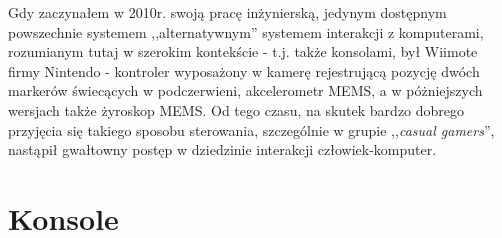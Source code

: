 \label{ch:current_state}

Gdy zaczynałem w 2010r. swoją pracę inżynierską, jedynym dostępnym powszechnie systemem ,,alternatywnym'' systemem interakcji z komputerami, rozumianym tutaj w szerokim kontekście - t.j. także konsolami, był Wiimote firmy Nintendo - kontroler wyposażony w kamerę rejestrującą pozycję dwóch markerów świecących w podczerwieni, akcelerometr MEMS, a w póżniejszych wersjach także żyroskop MEMS. Od tego czasu, na skutek bardzo dobrego przyjęcia się takiego sposobu sterowania, szczególnie w grupie ,,\textit{casual gamers}'', nastąpił gwałtowny postęp w dziedzinie interakcji człowiek-komputer.\\

\section{Konsole}

